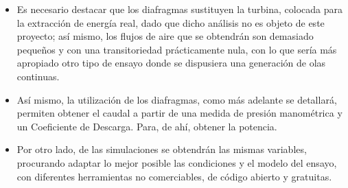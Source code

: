 \begin{itemize}
  \begin{itemize}
  \item
    Es necesario destacar que los diafragmas sustituyen la turbina,
    colocada para la extracción de energía real, dado que dicho análisis
    no es objeto de este proyecto; así mismo, los flujos de aire que se
    obtendrán son demasiado pequeños y con una transitoriedad
    prácticamente nula, con lo que sería más apropiado otro tipo de
    ensayo donde se dispusiera una generación de olas continuas. 
  \item
    Así mismo, la utilización de los diafragmas, como más adelante se
    detallará, permiten obtener el caudal a partir de una medida de
    presión manométrica y un Coeficiente de Descarga. Para, de ahí,
    obtener la potencia.
  \item
    Por otro lado, de las simulaciones se obtendrán las mismas
    variables, procurando adaptar lo mejor posible las condiciones y el
    modelo del ensayo, con diferentes herramientas no comerciables, de
    código abierto y gratuitas. 
  \end{itemize}
\end{itemize}

